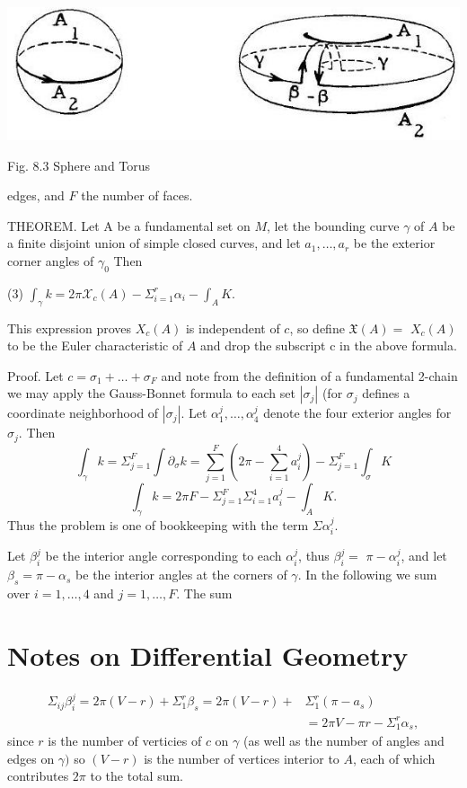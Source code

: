 \documentclass[10pt]{article}
\begin{document}
\includegraphics[max width=\textwidth]{2022_07_16_f4e476ee2159dc67e746g-58}

Fig. $8.3$ Sphere and Torus

edges, and $F$ the number of faces.

THEOREM. Let A be a fundamental set on $M$, let the bounding curve $\gamma$ of $A$ be a finite disjoint union of simple closed curves, and let $a_{1}, \ldots, a_{r}$ be the exterior corner angles of $\gamma_{0}$ Then

(3) $\int_{\gamma} k=2 \pi \mathcal{X}_{c}(A)-\Sigma_{i=1}^{r} \alpha_{i}-\int_{A} K$.

This expression proves $X_{c}(A)$ is independent of $c$, so define $\mathfrak{X}(A)=$ $X_{c}(A)$ to be the Euler characteristic of $A$ and drop the subscript c in the above formula.

Proof. Let $c=\sigma_{1}+\ldots+\sigma_{F}$ and note from the definition of a fundamental 2-chain we may apply the Gauss-Bonnet formula to each set $\left|\sigma_{j}\right|$ (for $\sigma_{j}$ defines a coordinate neighborhood of $\left|\sigma_{j}\right|$. Let $\alpha_{1}^{j}, \ldots, \alpha_{4}^{j}$ denote the four exterior angles for $\sigma_{j}$. Then
$$
\int_{\gamma} k=\Sigma_{j=1}^{F} \int \partial_{\sigma} k=\sum_{j=1}^{F}\left(2 \pi-\sum_{i=1}^{4} a_{i}^{j}\right)-\Sigma_{j=1}^{F} \int_{\sigma} K
$$
$$
\int_{\gamma} k=2 \pi F-\Sigma_{j=1}^{F} \Sigma_{i=1}^{4} a_{i}^{j}-\int_{A} K .
$$
Thus the problem is one of bookkeeping with the term $\Sigma \alpha_{i}^{j}$.

Let $\beta_{i}^{j}$ be the interior angle corresponding to each $\alpha_{i}^{j}$, thus $\beta_{i}^{j}=$ $\pi-\alpha_{i}^{j}$, and let $\beta_{s}=\pi-\alpha_{s}$ be the interior angles at the corners of $\gamma$. In the following we sum over $i=1, \ldots, 4$ and $j=1, \ldots, F$. The sum

\section{Notes on Differential Geometry}
$$
\begin{aligned}
\Sigma_{i j} \beta_{i}^{j}=2 \pi(V-r)+\Sigma_{1}^{r} \beta_{s}=2 \pi(V-r)+& \Sigma_{1}^{r}\left(\pi-a_{s}\right) \\
&=2 \pi V-\pi r-\Sigma_{1}^{r} \alpha_{s},
\end{aligned}
$$
since $r$ is the number of verticies of $c$ on $\gamma$ (as well as the number of angles and edges on $\gamma)$ so $(V-r)$ is the number of vertices interior to $A$, each of which contributes $2 \pi$ to the total sum.
\end{document}
